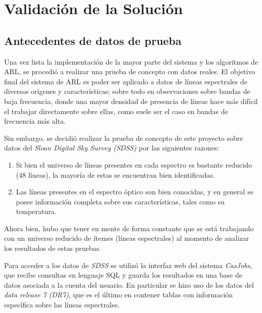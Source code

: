 \chapter{Validación de la Solución}


\section{Antecedentes de datos de prueba}


Una vez lista la implementación de la mayor parte del sistema y los algoritmos de ARL, se procedió a realizar una prueba de concepto con datos reales. El objetivo final del sistema de ARL es poder ser aplicado a datos de líneas espectrales de diversos orígenes y características; sobre todo en observaciones sobre bandas de baja frecuencia, donde una mayor densidad de presencia de líneas hace más difícil el trabajar directamente sobre ellas, como suele ser el caso en bandas de frecuencia más alta.

Sin embargo, se decidió realizar la prueba de concepto de este proyecto sobre datos del \textit{Sloan Digital Sky Survey (SDSS)} por las siguientes razones:

\begin{enumerate}
\item Si bien el universo de líneas presentes en cada espectro es bastante reducido (48 líneas), la mayoría de estas se encuentran bien identificadas.
\item Las líneas presentes en el espectro óptico son bien conocidas, y en general se posee información completa sobre sus características, tales como su temperatura.
\end{enumerate}

Ahora bien, hubo que tener en mente de forma constante que se está trabajando con un universo reducido de ítemes (líneas espectrales) al momento de analizar los resultados de estas pruebas.

Para acceder a los datos de \textit{SDSS} se utilizó la interfaz web del sistema \textit{CasJobs}, que recibe consultas en lenguaje SQL y guarda los resultados en una base de datos asociada a la cuenta del usuario. En particular se hizo uso de los datos del \textit{data release 7 (DR7)}, que es el último en contener tablas con información específica sobre las líneas espectrales.


